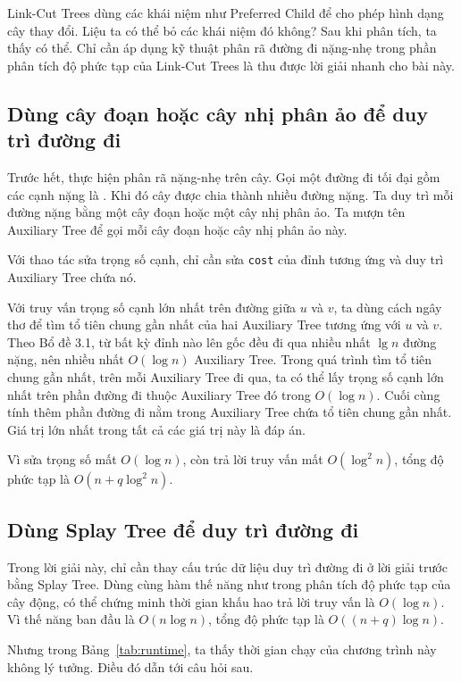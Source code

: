 \documentclass[11pt]{article}
\begin{document}
Link-Cut Trees dùng các khái niệm như Preferred Child để cho phép hình dạng cây
thay đổi. Liệu ta có thể bỏ các khái niệm đó không? Sau khi phân tích, ta thấy
có thể. Chỉ cần áp dụng kỹ thuật phân rã đường đi nặng-nhẹ trong phần phân
tích độ phức tạp của Link-Cut Trees là thu được lời giải nhanh cho bài này.

\subsection{Dùng cây đoạn hoặc cây nhị phân ảo để duy trì đường đi}

Trước hết, thực hiện phân rã nặng-nhẹ trên cây. Gọi một đường đi tối đại gồm
các cạnh nặng là . Khi đó cây được chia thành nhiều đường
nặng. Ta duy trì mỗi đường nặng bằng một cây đoạn hoặc một cây nhị phân ảo.
Ta mượn tên Auxiliary Tree để gọi mỗi cây đoạn hoặc cây nhị phân ảo này.

Với thao tác sửa trọng số cạnh, chỉ cần sửa \texttt{cost} của đỉnh tương ứng và
duy trì Auxiliary Tree chứa nó.

Với truy vấn trọng số cạnh lớn nhất trên đường giữa $u$ và $v$, ta dùng cách
ngây thơ để tìm tổ tiên chung gần nhất của hai Auxiliary Tree tương ứng với
$u$ và $v$. Theo Bổ đề 3.1, từ bất kỳ đỉnh nào lên gốc đều đi qua nhiều nhất
$\lg n$ đường nặng, nên nhiều nhất $O(\log n)$ Auxiliary Tree. Trong quá trình
tìm tổ tiên chung gần nhất, trên mỗi Auxiliary Tree đi qua, ta có thể lấy
trọng số cạnh lớn nhất trên phần đường đi thuộc Auxiliary Tree đó trong
$O(\log n)$. Cuối cùng tính thêm phần đường đi nằm trong Auxiliary Tree chứa
tổ tiên chung gần nhất. Giá trị lớn nhất trong tất cả các giá trị này là đáp
án.

Vì sửa trọng số mất $O(\log n)$, còn trả lời truy vấn mất $O(\log^2 n)$, tổng
độ phức tạp là $O(n+q\log^2 n)$.

\subsection{Dùng Splay Tree để duy trì đường đi}

Trong lời giải này, chỉ cần thay cấu trúc dữ liệu duy trì đường đi ở lời giải
trước bằng Splay Tree. Dùng cùng hàm thế năng như trong phân tích độ phức tạp
của cây động, có thể chứng minh thời gian khấu hao trả lời truy vấn là
$O(\log n)$. Vì thế năng ban đầu là $O(n\log n)$, tổng độ phức tạp là
$O((n+q)\log n)$.

Nhưng trong Bảng~\ref{tab:runtime}, ta thấy thời gian chạy của chương trình này
không lý tưởng. Điều đó dẫn tới câu hỏi sau.
\end{document}
